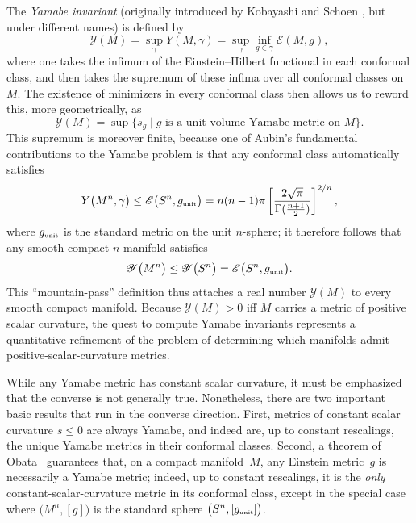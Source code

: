 \documentclass[10pt,a4paper]{amsart}
\numberwithin{equation}{section}
\begin{document}
The {\em Yamabe invariant} (originally introduced by Kobayashi \cite{okob} and Schoen \cite{sch}, but under different names)
is defined by
\begin{equation*}
\mathscr{Y}(M) = \sup_\gamma Y(M, \gamma ) = \sup_\gamma \inf_{g\in \gamma} \mathscr{E} (M, g),
\end{equation*}
where one takes the infimum of the Einstein--Hilbert functional in each conformal class, and then takes the supremum of these infima over
 all conformal classes on $M$.
The existence of minimizers in every conformal class then allows us to reword this, more geometrically, as
\begin{equation*}
\mathscr{Y}(M) = \sup \{ s_g \mid g \text{ is a unit-volume Yamabe metric on } M \}.
\end{equation*}
This supremum is moreover finite, because one of Aubin's fundamental contributions to the Yamabe problem
is that any conformal class automatically satisfies
\begin{equation*}
{Y}\big(M^n, \gamma \big) \leq \mathscr{E}\big(S^n, g_{\text{\tiny unit}} \big)= n(n-1)\pi \left[
\frac{2\sqrt{\pi}}{\Gamma (\frac{n+1}{2})}
\right]^{2/n},
\end{equation*}
where $g_{\text{\tiny unit}}$ is the standard metric on the unit $n$-sphere; it therefore follows that any
smooth compact $n$-manifold satisfies
\begin{equation*}
\mathscr{Y}\big(M^n \big) \leq \mathscr{Y}\big(S^n \big)= \mathscr{E}\big(S^n, g_{\text{\tiny unit}} \big).
\end{equation*}
This ``mountain-pass'' definition thus attaches
a real number $\mathscr{Y}(M)$ to every smooth compact manifold.
Because $\mathscr{Y}(M)>0$ iff $M$ carries a metric of positive scalar curvature,
 the quest to compute Yamabe invariants represents a %
 quantitative refinement of the problem
of determining which manifolds admit positive-scalar-curvature metrics.

While any Yamabe metric has constant scalar curvature, it must be emphasized that the converse is not generally true.
Nonetheless, there are two important basic results that run in the converse direction.
First, metrics of constant scalar curvature $s\leq 0$ are always Yamabe, and indeed are, up to constant rescalings,
 the unique Yamabe metrics in their conformal classes. Second, a theorem of Obata~\cite{obata} guarantees that, on a compact manifold~$M$, any Einstein metric~$g$
is necessarily a Yamabe metric; indeed, up to constant rescalings, it is the {\em only} constant-scalar-curvature metric in its conformal class,
except in the special case where $\big(M^n, [g]\big)$ is the standard sphere $\big(S^n, [g_{\text{\tiny unit}}]\big)$.
\end{document}
